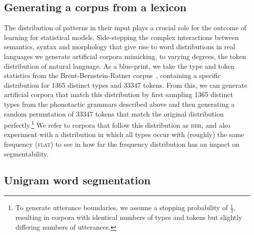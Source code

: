 \documentclass[11pt]{article}
\begin{document}
\subsection{Generating a corpus from a lexicon}

The distribution of patterns in their input plays a crucial role for the outcome of learning for statistical models. Side-stepping the complex interactions between semantics, syntax and morphology that give rise to word distributions in real languages we generate artificial corpora mimicking, to varying degrees, the token distribution of natural language. As a blue-print, we take the type and token statistics from the Brent-Bernstein-Ratner corpus~\cite{Brent99a}, containing a specific distribution for 1365 distinct types and 33347 tokens. From this, we can generate artificial corpora that match this distribution by first sampling 1365 distinct types from the phonotactic grammars described above and then generating a random permutation of 33347 tokens that match the original distribution perfectly.\footnote{To generate utterance boundaries, we assume a stopping probability of $\frac{1}{3}$, resulting in corpora with identical numbers of types and tokens but slightly differing numbers of utterances.} We refer to corpora that follow this distribution as \textsc{bbr}, and also experiment with a distribution in which all types occur with (roughly) the same frequency (\textsc{flat}) to see in how far the frequency distribution has an impact on segmentability.%

\subsection{Unigram word segmentation}
\end{document}
